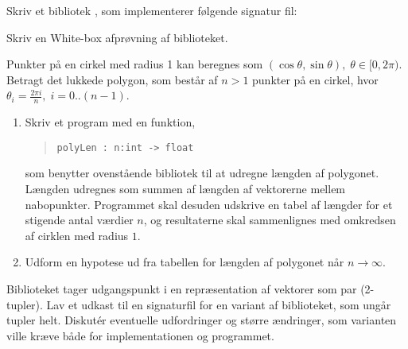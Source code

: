 \item Skriv et bibliotek , som implementerer følgende signatur fil:
\item Skriv en White-box afprøvning af biblioteket.
\item Punkter på en cirkel med radius 1 kan beregnes som $(\cos \theta, \sin \theta), \;\theta\in [0,2\pi)$. Betragt det lukkede polygon, som består af $n>1$ punkter på en cirkel, hvor $\theta_i = \frac{2\pi i}{n},\; i = 0..(n-1)$. 
  \begin{enumerate}
  \item Skriv et program med en funktion,
  \begin{quote}
    \lstinline{polyLen : n:int -> float}
  \end{quote}
som benytter ovenstående bibliotek til at udregne længden af polygonet. Længden udregnes som summen af længden af vektorerne mellem nabopunkter. Programmet skal desuden udskrive en tabel af længder for et stigende antal værdier $n$, og resultaterne skal sammenlignes med omkredsen af cirklen med radius $1$. 
\item Udform en hypotese ud fra tabellen for længden af polygonet når $n\rightarrow\infty$.
  \end{enumerate}
\item Biblioteket  tager udgangspunkt i en repræsentation af vektorer som par (2-tupler). Lav et udkast til en signaturfil for en variant af biblioteket, som ungår tupler helt. Diskut\'{e}r eventuelle udfordringer og større ændringer, som varianten ville kræve både for implementationen og programmet.
